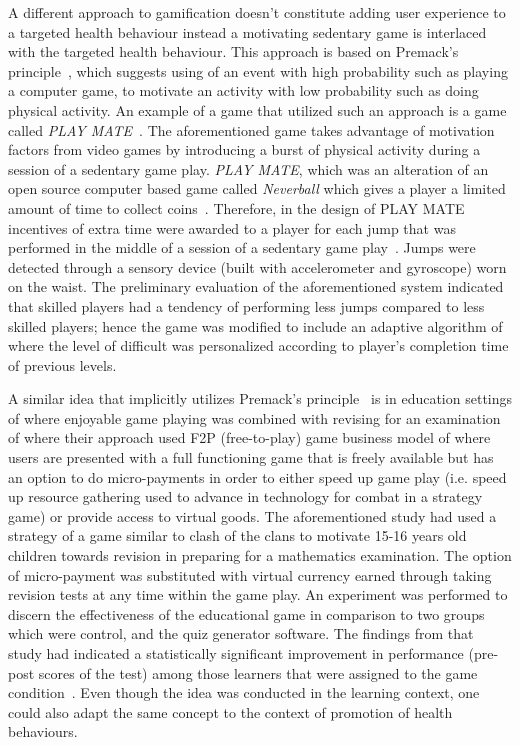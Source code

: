 A different approach to gamification doesn't constitute adding user experience to a targeted health behaviour instead a motivating sedentary game is interlaced with the targeted health behaviour. This approach is based on Premack's principle~\citep{premack1959toward}, which suggests using of an event with high probability such as playing a computer game, to motivate an activity with low probability such as doing physical activity. An example of a game that utilized such an approach is a game called \emph{PLAY MATE}~\citep{berkovsky2010physical,berkovsky2012physical}. The aforementioned game takes advantage of motivation factors from video games by introducing a burst of physical activity during a session of a sedentary game play. \emph{PLAY MATE}, which was an alteration of an open source computer based game called \emph{Neverball} which gives a player a limited amount of time to collect coins~\citep{berkovsky2012physical}. Therefore, in the design of PLAY MATE incentives of extra time were awarded to a player for each jump that was performed in the middle of a session of a sedentary game play~\citep{berkovsky2012physical}. Jumps were detected through a sensory device (built with accelerometer and gyroscope) worn on the waist. The preliminary evaluation of the aforementioned system indicated that skilled players had a tendency of performing less jumps compared to less skilled players; hence the game was modified to include an adaptive algorithm of where the level of difficult was personalized according to player's completion time of previous levels.

A similar idea that implicitly utilizes Premack's principle~\citep{premack1959toward} is in education settings of where enjoyable  game  playing was combined with revising for an examination~\citep{preist2015use} of where their approach used F2P (free-to-play) game business model of where users are presented with a full functioning game that is freely available but has an option to do micro-payments in order to either speed up game play (i.e. speed up resource gathering used to advance in technology for combat in a strategy game) or provide access to virtual goods. The aforementioned study had used a strategy of a game similar to clash of the clans to motivate 15-16 years old children towards revision in preparing for a mathematics examination. The option of micro-payment was substituted with virtual currency earned through taking revision tests at any time within the game play. An experiment was performed to discern the effectiveness of the educational game in comparison to two groups which were control, and the quiz generator software. The findings from that study had indicated a statistically significant improvement in performance (pre-post scores of the test) among those learners that were assigned to the game condition~\citep{preist2015use}. Even though the idea was conducted in the learning context, one could also adapt the same concept to the context of promotion of health behaviours.

